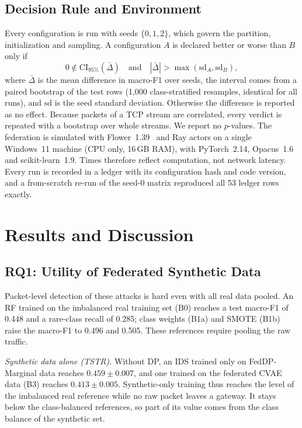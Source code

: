 \documentclass[conference]{IEEEtran}
\begin{document}
\subsection{Decision Rule and Environment}
Every configuration is run with seeds $\{0, 1, 2\}$, which govern the partition, initialization and sampling. A configuration $A$ is declared better or worse than $B$ only if
\begin{equation}
0 \notin \mathrm{CI}_{95\%}(\bar{\Delta}) \quad \text{and} \quad |\bar{\Delta}| > \max(\mathrm{sd}_A, \mathrm{sd}_B),
\label{eq:decision_rule}
\end{equation}
where $\bar{\Delta}$ is the mean difference in macro-F1 over seeds, the interval comes from a paired bootstrap of the test rows (1,000 class-stratified resamples, identical for all runs), and $\mathrm{sd}$ is the seed standard deviation. Otherwise the difference is reported as no effect. Because packets of a TCP stream are correlated, every verdict is repeated with a bootstrap over whole streams. We report no $p$-values. The federation is simulated with Flower~1.39~\cite{beutel2020} and Ray actors on a single Windows~11 machine (CPU only, 16\,GB RAM), with PyTorch~2.14, Opacus~1.6 and scikit-learn~1.9. Times therefore reflect computation, not network latency. Every run is recorded in a ledger with its configuration hash and code version, and a from-scratch re-run of the seed-0 matrix reproduced all 53 ledger rows exactly.

\section{Results and Discussion}\label{sec:results}

\subsection{RQ1: Utility of Federated Synthetic Data}\label{subsec:rq1}
Packet-level detection of these attacks is hard even with all real data pooled. An RF trained on the imbalanced real training set (B0) reaches a test macro-F1 of 0.448 and a rare-class recall of 0.285; class weights (B1a) and SMOTE (B1b) raise the macro-F1 to 0.496 and 0.505. These references require pooling the raw traffic.

\textit{Synthetic data alone (TSTR).} Without DP, an IDS trained only on FedDP-Marginal data reaches $0.459 \pm 0.007$, and one trained on the federated CVAE data (B3) reaches $0.413 \pm 0.005$. Synthetic-only training thus reaches the level of the imbalanced real reference while no raw packet leaves a gateway. It stays below the class-balanced references, so part of its value comes from the class balance of the synthetic set.
\end{document}
